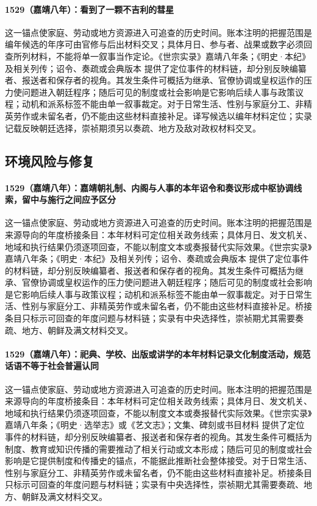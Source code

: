 \paragraph{1529（嘉靖八年）：看到了一颗不吉利的彗星} 这一锚点使家庭、劳动或地方资源进入可追查的历史时间。账本注明的把握范围是编年候选的年序可由官修与后出材料交叉；具体月日、参与者、战果或数字必须回查所列材料，不能将单一叙事当作定论。《世宗实录》嘉靖八年条；《明史·本纪》及相关列传；诏令、奏疏或会典版本 提供了定位事件的材料链，却分别反映编纂者、报送者和保存者的视角。其发生条件可概括为继承、官僚协调或皇权运作的压力使问题进入朝廷程序；随后可见的制度或社会影响是它影响后续人事与政策议程；动机和派系标签不能由单一叙事裁定。对于日常生活、性别与家庭分工、非精英劳作或未留名者，仍不能由这些材料直接补足。译写候选以编年材料定位；实录记载反映朝廷选择，崇祯期须另以奏疏、地方及敌对政权材料交叉。

\subsection{环境风险与修复}

\paragraph{1529（嘉靖八年）：嘉靖朝礼制、内阁与人事的本年诏令和奏议形成中枢协调线索，留中与施行之间应予区分} 这一锚点使家庭、劳动或地方资源进入可追查的历史时间。账本注明的把握范围是来源导向的年度桥接条目：本年材料可定位相关政务线索；具体月日、发文机关、地域和执行结果仍须逐项回查，不能以制度文本或奏报替代实际效果。《世宗实录》嘉靖八年条；《明史·本纪》及相关列传；诏令、奏疏或会典版本 提供了定位事件的材料链，却分别反映编纂者、报送者和保存者的视角。其发生条件可概括为继承、官僚协调或皇权运作的压力使问题进入朝廷程序；随后可见的制度或社会影响是它影响后续人事与政策议程；动机和派系标签不能由单一叙事裁定。对于日常生活、性别与家庭分工、非精英劳作或未留名者，仍不能由这些材料直接补足。桥接条目只标示可回查的年度问题与材料链；实录有中央选择性，崇祯期尤其需要奏疏、地方、朝鲜及满文材料交叉。

\paragraph{1529（嘉靖八年）：祀典、学校、出版或讲学的本年材料记录文化制度活动，规范话语不等于社会普遍认同} 这一锚点使家庭、劳动或地方资源进入可追查的历史时间。账本注明的把握范围是来源导向的年度桥接条目：本年材料可定位相关政务线索；具体月日、发文机关、地域和执行结果仍须逐项回查，不能以制度文本或奏报替代实际效果。《世宗实录》嘉靖八年条；《明史·选举志》或《艺文志》；文集、碑刻或书目材料 提供了定位事件的材料链，却分别反映编纂者、报送者和保存者的视角。其发生条件可概括为制度、教育或知识传播的需要推动了相关行动或文本形成；随后可见的制度或社会影响是它提供制度和传播史的锚点，不能据此推断社会整体接受。对于日常生活、性别与家庭分工、非精英劳作或未留名者，仍不能由这些材料直接补足。桥接条目只标示可回查的年度问题与材料链；实录有中央选择性，崇祯期尤其需要奏疏、地方、朝鲜及满文材料交叉。

